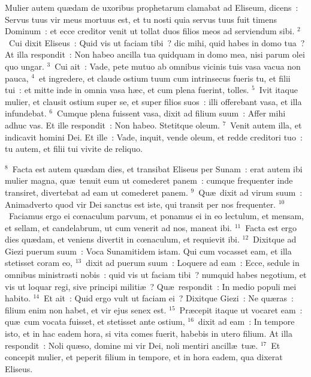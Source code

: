 \bchapter
\lettrine[lines=3,image=true,loversize=0.05,lraise=-0.03]{M}{}ulier autem qu\ae dam de uxoribus prophetarum clamabat ad Eliseum, dicens~: Servus tuus vir meus mortuus est, et tu nosti quia servus tuus fuit timens Dominum~: et ecce creditor venit ut tollat duos filios meos ad serviendum sibi.
${}^{2}$~Cui dixit Eliseus~: Quid vis ut faciam tibi~? dic mihi, quid habes in domo tua~? At illa respondit~: Non habeo ancilla tua quidquam in domo mea, nisi parum olei quo ungar.
${}^{3}$~Cui ait~: Vade, pete mutuo ab omnibus vicinis tuis vasa vacua non pauca,
${}^{4}$~et ingredere, et claude ostium tuum cum intrinsecus fueris tu, et filii tui~: et mitte inde in omnia vasa h\ae c, et cum plena fuerint, tolles.
${}^{5}$~Ivit itaque mulier, et clausit ostium super se, et super filios suos~: illi offerebant vasa, et illa infundebat.
${}^{6}$~Cumque plena fuissent vasa, dixit ad filium suum~: Affer mihi adhuc vas. Et ille respondit~: Non habeo. Stetitque oleum.
${}^{7}$~Venit autem illa, et indicavit homini Dei. Et ille~: Vade, inquit, vende oleum, et redde creditori tuo~: tu autem, et filii tui vivite de reliquo.


${}^{8}$~Facta est autem qu\ae dam dies, et transibat Eliseus per Sunam~: erat autem ibi mulier magna, qu\ae\ tenuit eum ut comederet panem~: cumque frequenter inde transiret, divertebat ad eam ut comederet panem.
${}^{9}$~Qu\ae\ dixit ad virum suum~: Animadverto quod vir Dei sanctus est iste, qui transit per nos frequenter.
${}^{10}$~Faciamus ergo ei cœnaculum parvum, et ponamus ei in eo lectulum, et mensam, et sellam, et candelabrum, ut cum venerit ad nos, maneat ibi.
${}^{11}$~Facta est ergo dies qu\ae dam, et veniens divertit in cœnaculum, et requievit ibi.
${}^{12}$~Dixitque ad Giezi puerum suum~: Voca Sunamitidem istam. Qui cum vocasset eam, et illa stetisset coram eo,
${}^{13}$~dixit ad puerum suum~: Loquere ad eam~: Ecce, sedule in omnibus ministrasti nobis~: quid vis ut faciam tibi~? numquid habes negotium, et vis ut loquar regi, sive principi militi\ae~? Qu\ae\ respondit~: In medio populi mei habito.
${}^{14}$~Et ait~: Quid ergo vult ut faciam ei~? Dixitque Giezi~: Ne qu\ae ras~: filium enim non habet, et vir ejus senex est.
${}^{15}$~Pr\ae cepit itaque ut vocaret eam~: qu\ae\ cum vocata fuisset, et stetisset ante ostium,
${}^{16}$~dixit ad eam~: In tempore isto, et in hac eadem hora, si vita comes fuerit, habebis in utero filium. At illa respondit~: Noli qu\ae so, domine mi vir Dei, noli mentiri ancill\ae\ tu\ae .
${}^{17}$~Et concepit mulier, et peperit filium in tempore, et in hora eadem, qua dixerat Eliseus.


